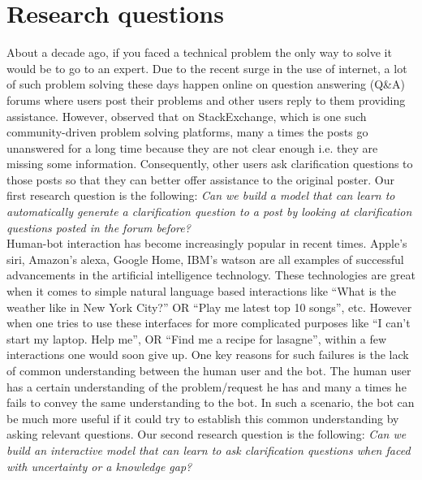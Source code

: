 \documentclass[11pt]{report}
\newcommand\newcite{\citet}
\begin{document}
\section{Research questions}

About a decade ago, if you faced a technical problem the only way to solve it would be to go to an expert. Due to the recent surge in the use of internet, a lot of such problem solving these days happen online on question answering (Q\&A) forums where users post their problems and other users reply to them providing assistance. However, \newcite{asaduzzaman2013answering} observed that on StackExchange, which is one such community-driven problem solving platforms, many a times the posts go unanswered for a long time because they are not clear enough i.e. they are missing some information. Consequently, other users ask clarification questions to those posts so that they can better offer assistance to the original poster. Our first research question is the following: \textit{Can we build a model that can learn to automatically generate a clarification question to a post by looking at clarification questions posted in the forum before?}\\

\noindent
Human-bot interaction has become increasingly popular in recent times. Apple's siri, Amazon's alexa, Google Home, IBM's watson are all examples of successful advancements in the artificial intelligence technology. These technologies are great when it comes to simple natural language based interactions like ``What is the weather like in New York City?'' OR ``Play me latest top 10 songs'', etc. However when one tries to use these interfaces for more complicated purposes like ``I can't start my laptop. Help me\!'', OR ``Find me a recipe for lasagne'', within a few interactions one would soon give up. One key reasons for such failures is the lack of common understanding between the human user and the bot. The human user has a certain understanding of the problem/request he has and many a times he fails to convey the same understanding to the bot. In such a scenario, the bot can be much more useful if it could try to establish this common understanding by asking relevant questions. Our second research question is the following: \textit{Can we build an interactive model that can learn to ask clarification questions when faced with uncertainty or a knowledge gap?}\\

\noindent
\end{document}
